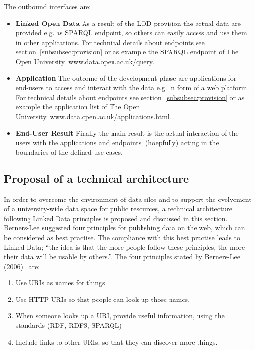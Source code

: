 The outbound interfaces are:

\begin{itemize}
	\item \textbf{Linked Open Data}\newline
	As a result of the LOD provision the actual data are provided e.g. as SPARQL endpoint, so others can easily access and use them in other applications. For technical details about endpoints see section~\ref{subsubsec:provision} or as example the SPARQL endpoint of The Open University~\url{www.data.open.ac.uk/query}.
	\item \textbf{Application}\newline
	The outcome of the development phase are applications for end-users to access and interact with the data e.g. in form of a web platform. For technical details about endpoints see section~\ref{subsubsec:provision} or as example the application list of The Open University~\url{www.data.open.ac.uk/applications.html}.
	\item \textbf{End-User Result}\newline
	Finally the main result is the actual interaction of the users with the applications and endpoints, (hoepfully) acting in the boundaries of the defined use cases.
\end{itemize}

\newpage

\subsection{Proposal of a technical architecture}

In order to overcome the environment of data silos and to support the evolvement of a university-wide data space for public resources, a technical architecture following Linked Data principles is proposed and discussed in this section. Berners-Lee suggested four principles for publishing data on the web, which can be considered as best practise. The compliance with this best practise leads to Linked Data; \enquote{the idea is that the more people follow these principles, the more their data will be usable by others.}\cite{simperl_using_2013}. The four principles stated by Berners-Lee (2006)~\cite{article:bernerslee_2006} are:
\begin{enumerate}
	\item Use URIs as names for things
	\item Use HTTP URIs so that people can look up those names.
	\item When someone looks up a URI, provide useful information, using the standards (RDF, RDFS, SPARQL)
	\item Include links to other URIs. so that they can discover more things.
\end{enumerate}

